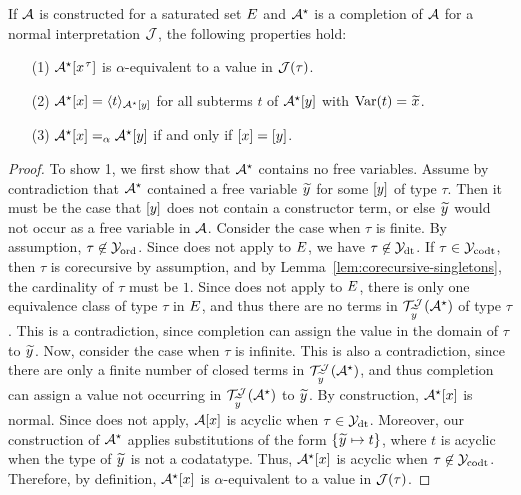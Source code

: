 \begin{lemma}
\label{lem:interpretation-completion}
If $\Val$ is constructed for a saturated set $\Ec$
and $\ValC$ is a completion of $\Val$ for a normal interpretation $\J$, the following properties hold:
\begin{enumerate}
\item[\rm (1)] $\ValC \ec{x\typ{\tau}}$ is $\alpha$-equivalent to a value in $\J( \tau )$.
\item[\rm (2)]
$\ValC \ec{x} = \interp{\ValC \ec{y}}{ t }$ for
all subterms $t$ of $\ValC \ec{y}$ with $\muvar(t) = {\Varec{x}}$.
\item[\rm (3)]
$\ValC \ec{x} \vsim \ValC \ec{y}$ if and only if $\ec{x} = \ec{y}$.
\end{enumerate}
\end{lemma}
\begin{rep}
\begin{proof}
To show 1, we first show that $\ValC$ contains no free variables.
Assume by contradiction that $\ValC$ contained a free variable ${\Varec{y}}$ for some $\ec{y}$ of type $\tau$.
Then it must be the case that $\ec{y}$ does not contain a constructor term,
or else ${\Varec{y}}$ would not occur as a free variable in $\Val$.
Consider the case when $\tau$ is finite.
By assumption, $\tau \not\in \Nondata$.
Since  does not apply to $\Ec$, we have $\tau \not\in \Data$.
If $\tau \in \Codata$, then $\tau$ is corecursive by assumption, and by Lemma~\ref{lem:corecursive-singletons},
the cardinality of $\tau$ must be $1$.
Since  does not apply to $\Ec$,
there is only one equivalence class of type $\tau$ in $\Ec$,
and thus there are no terms in $\mathcal{T}^{\smash{\J}}_{\Varec{y}}(\ValC)$ of type $\tau$.
This is a contradiction, since %
completion can assign the value in the domain of $\tau$ to ${\Varec{y}}$.
Now, consider the case when $\tau$ is infinite.
This is also a contradiction,
since there are only a finite number of closed terms in $\mathcal{T}^{\smash{\J}}_{\Varec{y}}(\ValC)$,
and thus %
completion can assign a value not occurring in $\mathcal{T}^{\smash{\J}}_{\Varec{y}}(\ValC)$ to ${\Varec{y}}$.
By construction, $\ValC \ec{x}$ is normal.
Since  does not apply, $\Val \ec{x}$ is acyclic when $\tau \in \Data$.
Moreover, our construction of $\ValC$ applies substitutions of the form
$\{ {\Varec{y}} \mapsto t \}$, where $t$ is acyclic when the type of ${\Varec{y}}$ is not a codatatype.
Thus, $\ValC \ec{x}$ is acyclic when $\tau \not\in \Codata$.
Therefore, by definition, $\ValC \ec{x}$ is $\alpha$-equivalent to a value in $\J( \tau )$.


\end{proof}
\end{rep}
